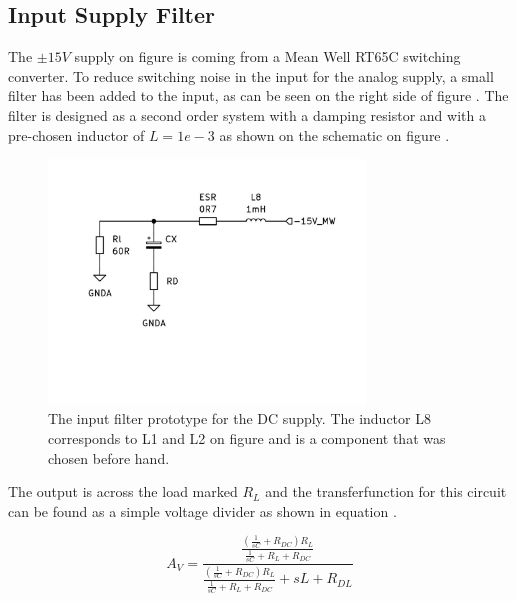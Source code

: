\subsection{Input Supply Filter} \label{subsec:SupplyFilter}

The $\pm 15V$ supply on figure  is coming from a Mean Well RT65C switching converter. To reduce switching noise in the input for the analog supply, a small filter has been added to the input, as can be seen on the right side of figure . The filter is designed as a second order system with a damping resistor and with a pre-chosen inductor of $L = 1e-3$ as shown on the schematic on figure .

\begin{figure}[H]
    \centering
    \includegraphics[clip, trim=0 150 0 0, width=0.75\textwidth]{Sections/7_SystemDesign/Figures/7_1_5_SupplyFilterSch.pdf}
    \caption{The input filter prototype for the DC supply. The inductor L8 corresponds to L1 and L2 on figure  and is a component that was chosen before hand.}
    \label{fig_7_1_5_SupplyFilterSch}
\end{figure}

The output is across the load marked $R_L$ and the transferfunction for this circuit can be found as a simple voltage divider as shown in equation .

\begin{equation}\label{eq:7_1_5_FILTF}
    A_V = \frac{    \frac{     (\frac{1}{sC} + R_{DC})R_L     }{  \frac{1}{sC} + R_L + R_{DC}  }      }{ \frac{     (\frac{1}{sC} + R_{DC})R_L     }{  \frac{1}{sC} + R_L + R_{DC}  }   + sL + R_{DL}}
\end{equation}

